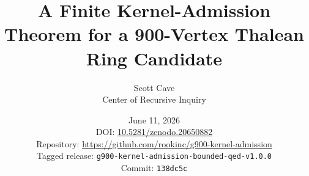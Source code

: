 \documentclass[11pt]{article}
\title{A Finite Kernel-Admission Theorem for a 900-Vertex Thalean Ring Candidate}
\author{Scott Cave\\
Center of Recursive Inquiry}
\date{June 11, 2026\\[0.5em]
\small DOI: \href{https://doi.org/10.5281/zenodo.20650882}{10.5281/zenodo.20650882}\\
\small Repository: \url{https://github.com/rookinc/g900-kernel-admission}\\
\small Tagged release: \texttt{g900-kernel-admission-bounded-qed-v1.0.0}\\
\small Commit: \texttt{138dc5c}}
\begin{document}
\maketitle












\nocite{cave2026g900kerneladmission}


\end{document}
